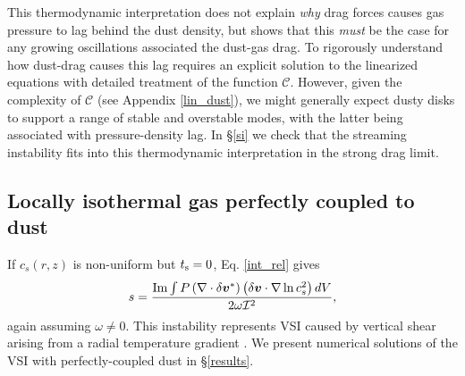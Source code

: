 This thermodynamic interpretation does not explain 
\emph{why} drag forces causes gas pressure to lag behind the dust
density, but shows 
that this \emph{must} be the case for any growing oscillations associated the
dust-gas drag. To rigorously understand how dust-drag causes this 
lag requires an explicit solution to the linearized equations with 
detailed treatment of the function $\mathcal{C}$. However, given the complexity of
$\mathcal{C}$ (see Appendix \ref{lin_dust}), we might generally expect
 dusty disks to  support a range of stable and overstable modes, with the
latter being associated with pressure-density lag. 
 In \S\ref{si} we check that the
streaming instability fits into this thermodynamic interpretation in
the strong drag limit.  






\subsection{Locally isothermal gas perfectly coupled to dust}\label{dusty_vsi_int}
If $c_s(r,z)$ is non-uniform but $t_\mathrm{s}=0$, Eq. \ref{int_rel} 
gives  
\begin{align}
  s = \frac{\operatorname{Im}\int P
    \left(\nabla\cdot\delta\bm{v}^*\right)\left(\delta\bm{v}\cdot\nabla\ln{c_s^2}\right)dV}{2\omega\mathcal{I}^2}, \label{vsi_check} 
\end{align} 
again assuming $\omega\neq0$. 
This instability represents VSI caused by vertical shear arising from a radial
temperature gradient \citep{nelson13,barker15,lin15}. We present 
numerical solutions of the VSI with perfectly-coupled dust in \S\ref{results}. 
